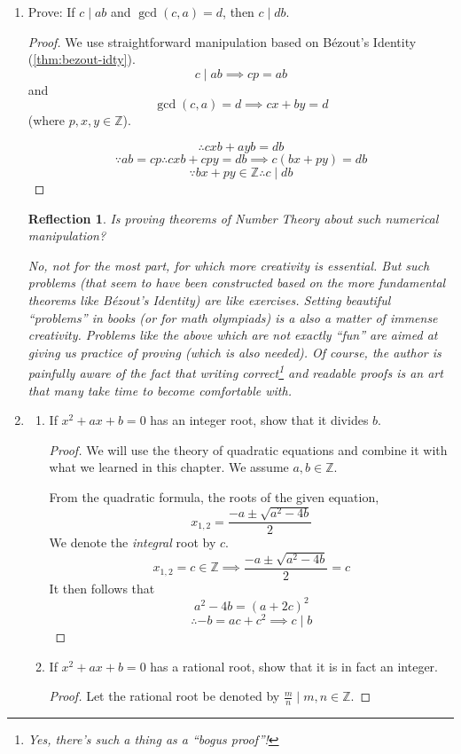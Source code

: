 \documentclass[english,notitlepage,smartquotes]{hgbreport}
\theoremstyle{definition}
\theoremstyle{remark}
\theoremstyle{plain}
\newtheorem{reflection}{Reflection}
\begin{document}
\begin{enumerate}[label=\textbf{\arabic*}.]
\item Prove: If $c\mid ab$ and $\gcd(c,a)=d$, then $c\mid db$.


\begin{proof}
We use straightforward manipulation based on B\'ezout's Identity (\ref{thm:bezout-idty}).
$$
c\mid ab\implies cp=ab
$$
and
$$
\gcd(c,a)=d\implies cx+by=d
$$
(where $p,x,y\in\mathbb{Z}$).

$$
\therefore cxb+ayb=db
$$
$$
\because ab=cp \therefore cxb+cpy=db\implies c(bx+py)=db
$$
$$
\because bx+py\in\mathbb{Z}\therefore c\mid db
$$
\end{proof}
\begin{reflection}
Is proving theorems of Number Theory about such numerical manipulation?

No, not for the most part, for which more creativity is essential. But such problems (that seem to have been constructed based on the more fundamental theorems like B\'ezout's Identity) are like exercises. Setting beautiful ``problems'' in books (or for math olympiads) is a also a matter of immense creativity. Problems like the above which are not exactly ``fun'' are aimed at giving us practice of proving (which is also needed). Of course, the author is painfully aware of the fact that writing correct\footnote{Yes, there's such a thing as a ``bogus proof''!} and readable proofs is an art that many take time to become comfortable with.
\end{reflection}

\item
\begin{enumerate}
\item If $x^2+ax+b=0$ has an integer root, show that it divides $b$.
\label{pr:115a}
\begin{proof}

We will use the theory of quadratic equations and combine it with what we learned in this chapter. We assume $a,b\in\mathbb{Z}$.

From the quadratic formula, the roots of the given equation,
$$
x_{1,2}=\frac{-a\pm\sqrt{a^2-4b}}{2}
$$
We denote the \emph{integral} root by $c$.
$$
x_{1,2}=c\in\mathbb{Z}\implies \frac{-a\pm\sqrt{a^2-4b}}{2}=c
$$
It then follows that
$$
a^2-4b=(a+2c)^2
$$
$$
\therefore -b=ac+c^2\implies c\mid b
$$
\end{proof}
\item If $x^2+ax+b=0$ has a rational root, show that it is in fact an integer. 
\label{pr:115b}
\begin{proof}
Let the rational root be denoted by $\frac{m}{n}\mid m,n\in\mathbb{Z}$.


\end{proof}
\end{enumerate}
\end{enumerate}
\end{document}
